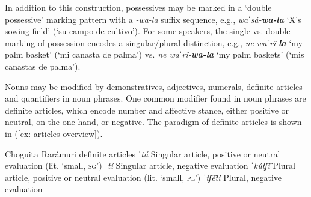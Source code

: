     \z
\z

In addition to this construction, possessives may be marked in a `double possessive' marking pattern with a \textit{-wa-la} suffix sequence, e.g., \textit{waˈsá-\textbf{wa-la}} ‘X’s sowing field’ (`su campo de cultivo'). For some speakers, the single vs. double marking of possession encodes a singular/plural distinction, e.g., \textit{ne waˈrî-\textbf{la}} `my palm basket’ (`mi canasta de palma') vs. \textit{ne waˈrî-\textbf{wa-la}} `my palm baskets’ (`mis canastas de palma').

Nouns may be modified by demonstratives, adjectives, numerals, definite articles and quantifiers in noun phrases. One common modifier found in noun phrases are definite articles, which encode number and affective stance, either positive or neutral, on the one hand, or negative. The paradigm of definite articles is shown in (\ref{ex: articles overview}).

\ea\label{ex: articles overview}
{Choguita Rarámuri definite articles}
  \ea  \textit{ˈtá}\hphantom{siʃ͡i}\hspace{1ex}  Singular article, positive or neutral evaluation (lit. `small, \textsc{sg}')
  \ex \textit{ˈtí}\hphantom{stʃ͡i}\hspace{1ex}  Singular article, negative evaluation
  \ex  \textit{ˈkútʃ͡i}\hspace{1ex} Plural article, positive or neutral evaluation (lit. `small, \textsc{pl}')
  \ex \textit{ˈtʃ͡éti}\hphantom{i}\hspace{1ex}  Plural, negative evaluation
    \z
\z

